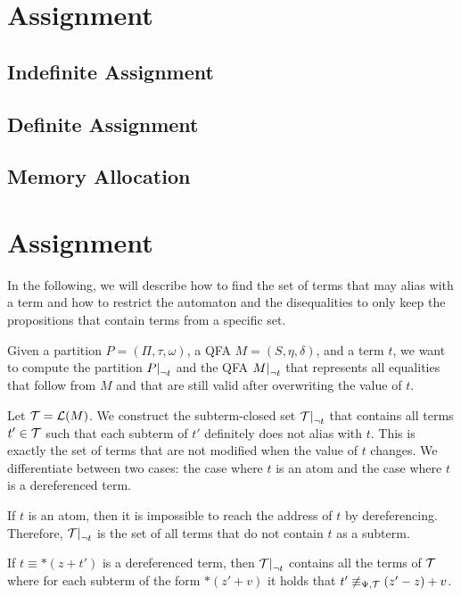 \section{Assignment}

\subsection{Indefinite Assignment}

\subsection{Definite Assignment}

\subsection{Memory Allocation}

\section{Assignment}


In the following, we will describe how to find the set of terms that may alias with a term and how to restrict the automaton and the disequalities to only keep the propositions that contain terms from a specific set.

Given a partition $P = (\Pi, \tau, \omega)$, a QFA $M = (S, \eta, \delta)$, and a term $t$, we want to compute the partition $\restr{P}{\neg t}$ and the QFA $\restr{M}{\neg t}$ that represents all equalities that follow from $M$ and that are still valid after overwriting the value of $t$.

Let $\mathcal{T} = \mathcal{L}(M)$. We construct the subterm-closed set $\restr{\T}{\neg t}$ that contains all terms $t' \in \mathcal{T}$ such that each subterm of $t'$ definitely does not alias with $t$.
This is exactly the set of terms that are not modified when the value of $t$ changes.
We differentiate between two cases: the case where $t$ is an atom and the case where $t$ is a dereferenced term.

If $t$ is an atom, then it is impossible to reach the address of $t$ by dereferencing.
Therefore, $\restr{\T}{\neg t}$ is the set of all terms that do not contain $t$ as a subterm.

If $t \equiv *(z + t')$ is a dereferenced term, then $\restr{\T}{\neg t}$ contains all the terms of $\mathcal{T}$ where for each subterm of the form $*(z' + v)$ it holds that $t' \not\equiv_{\Psi,\mathcal{T}} (z' - z) + v$.

